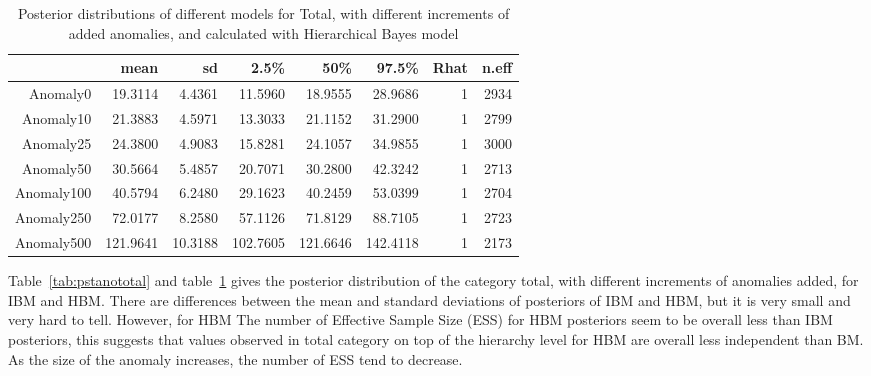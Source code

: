 \begin{table}[ht]
	\centering
	\begin{tabular}{rrrrrrrr}
		\hline
		& mean & sd & 2.5\% & 50\% & 97.5\% & Rhat & n.eff \\ 
		\hline
		Anomaly0 & 19.3114 & 4.4361 & 11.5960 & 18.9555 & 28.9686 & 1 & 2934 \\ 
		Anomaly10 & 21.3883 & 4.5971 & 13.3033 & 21.1152 & 31.2900 & 1 & 2799 \\ 
		Anomaly25 & 24.3800 & 4.9083 & 15.8281 & 24.1057 & 34.9855 & 1 & 3000 \\ 
		Anomaly50 & 30.5664 & 5.4857 & 20.7071 & 30.2800 & 42.3242 & 1 & 2713 \\ 
		Anomaly100 & 40.5794 & 6.2480 & 29.1623 & 40.2459 & 53.0399 & 1 & 2704 \\ 
		Anomaly250 & 72.0177 & 8.2580 & 57.1126 & 71.8129 & 88.7105 & 1 & 2723 \\ 
		Anomaly500 & 121.9641 & 10.3188 & 102.7605 & 121.6646 & 142.4118 & 1 & 2173 \\ 
		\hline
	\end{tabular}
	\caption{Posterior distributions of different models for Total, with different increments of added anomalies, and calculated with Hierarchical Bayes model} 
	\label{tab:pstanototal2}
\end{table}

Table~\ref{tab:pstanototal} and table~\ref{tab:pstanototal2} gives the posterior distribution of the category total, with different increments of anomalies added, for IBM and HBM. There are differences between the mean and standard deviations of posteriors of IBM and HBM, but it is very small and very hard to tell. However, for HBM The number of Effective Sample Size (ESS) for HBM posteriors seem to be overall less than IBM posteriors, this suggests that values observed in total category on top of the hierarchy level for HBM are overall less independent than BM. As the size of the anomaly increases, the number of ESS tend to decrease. 

\newpage

